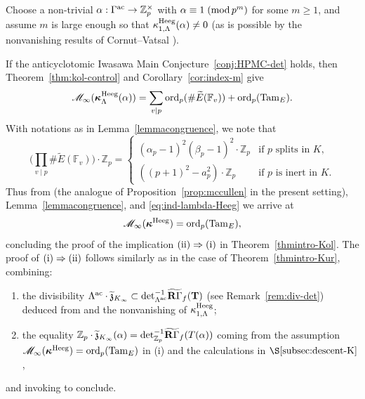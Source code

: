 \documentclass[10pt,reqno]{amsart}
\numberwithin{equation}{section}
\theoremstyle{plain}
\theoremstyle{definition}
\theoremstyle{definition}
\theoremstyle{plain}
\theoremstyle{plain}
\theoremstyle{plain}
\theoremstyle{plain}
\theoremstyle{plain}
\theoremstyle{plain}
\newcommand{\Tac}{\mathbf{T}}
\newcommand{\Z}{\mathbb{Z}}
\begin{document}
Choose a non-trivial $\alpha:\Gamma^{\rm ac}\rightarrow\Z_p^\times$ with $\alpha\equiv 1\;({\rm mod}\,p^m)$ for some $m\geq 1$, and assume $m$ is large enough so that $\kappa_{1,\Lambda}^{\rm Heeg}(\alpha)\neq 0$ (as is possible by the nonvanishing results of Cornut--Vatsal \cite{cornut,vatsal}).

If the anticyclotomic Iwasawa Main Conjecture~\ref{conj:HPMC-det} holds, then  Theorem~\ref{thm:kol-control} and Corollary~\ref{cor:index-m} give
\begin{equation}\label{eq:ind-lambda-Heeg}
\mathscr{M}_\infty(\boldsymbol{\kappa}_\Lambda^{\rm Heeg}(\alpha))=\sum_{v\mid p}{\rm ord}_p(\#\widetilde{E}(\mathbb{F}_v))+{\rm ord}_p({\rm Tam}_E).
\end{equation}
With notations as in Lemma~\ref{lemmacongruence}, we note that
\[
\Biggl(\prod_{v\mid p}\#\widetilde{E}(\mathbb{F}_v)\Bigg)\cdot\Z_p=\begin{cases}
(\alpha_p-1)^2(\beta_p-1)^2\cdot\Z_p&\textrm{if $p$ splits in $K$,}\\[0.2em]
((p+1)^2-a_p^2)\cdot\Z_p&\textrm{if $p$ is inert in $K$.}
\end{cases}
\]
Thus from \cite[Prop.~2.2.1]{BCGS} (the analogue of Proposition~\ref{prop:mccullen} in the present  setting), Lemma~\ref{lemmacongruence}, and \eqref{eq:ind-lambda-Heeg} we arrive at
\[
\mathscr{M}_\infty(\boldsymbol{\kappa}^{\rm Heeg})={\rm ord}_p({\rm Tam}_E),
\]
concluding the proof of the implication ${\rm (ii)}\Rightarrow{\rm (i)}$ in Theorem~\ref{thmintro-Kol}. The proof of ${\rm (i)}\Rightarrow{\rm (ii)}$ follows similarly as in the case of Theorem~\ref{thmintro-Kur}, combining:
\begin{enumerate}
\item the divisibility
$\Lambda^{\rm ac}\cdot\widetilde{\mathfrak{z}}_{K_\infty}\subset{\det}_{\Lambda^{\rm ac}}^{-1}\widetilde{\mathbf{R}\Gamma}_f(\Tac)$ (see Remark~\ref{rem:div-det}) deduced from \cite[Thm.~2.2.10]{howard} and the nonvanishing of $\kappa_{1,\Lambda}^{\rm Heeg}$;
\item the equality $\Z_p\cdot\widetilde{\mathfrak{z}}_{K_\infty}(\alpha)={\rm det}_{\Z_p}^{-1}\widetilde{\mathbf{R}\Gamma}_f(T(\alpha))$ coming from the assumption $\mathscr{M}_\infty(\boldsymbol{\kappa}^{\rm Heeg})={\rm ord}_p({\rm Tam}_E)$ in (i) and the calculations in $\S\ref{subsec:descent-K}$,
\end{enumerate}
and invoking \cite[Lem.~3.2]{skinner-urban} to conclude.





\end{document}
